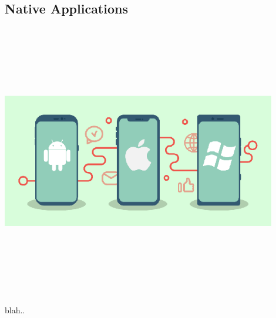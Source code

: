 \subsection{Native Applications}
\par
\medskip
\begin{center}
    \includegraphics[width=12cm,height=12cm,keepaspectratio]{Images/nativeapp2.png}
\end{center}

blah..


